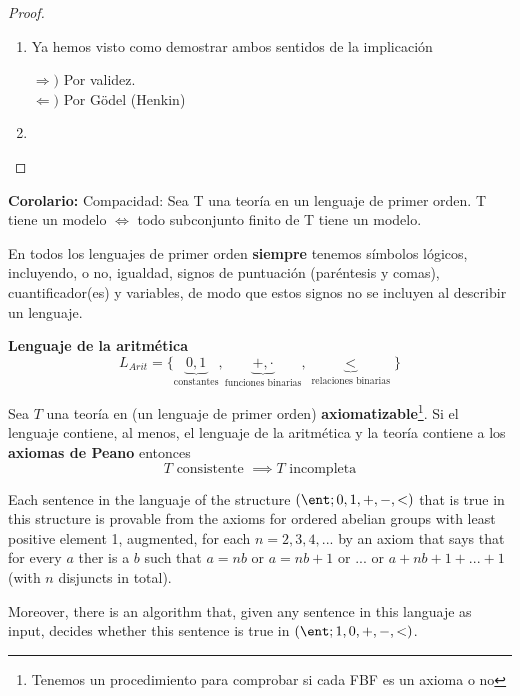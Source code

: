 \begin{proof}
\begin{enumerate}
\item
Ya hemos visto como demostrar ambos sentidos de la implicación

$\Rightarrow)$ Por validez.\\
$\Leftarrow)$ Por Gödel (Henkin)

\item
\end{enumerate}
\end{proof}

\textbf{Corolario:} Compacidad: Sea T una teoría en un lenguaje de primer orden. T tiene un modelo $\Leftrightarrow$ todo subconjunto finito de T tiene un modelo.

En todos los lenguajes de primer orden \textbf{siempre} tenemos símbolos lógicos, incluyendo, o no, igualdad, signos de puntuación (paréntesis y comas), cuantificador(es) y variables, de modo que estos signos no se incluyen al describir un lenguaje.

\begin{example}
\textbf{Lenguaje de la aritmética}
\[L_{Arit} = \{\underbrace{0,1}_{\text{constantes}},\underbrace{+,\cdot}_{\text{funciones binarias}}, \underbrace{<}_{\text{relaciones binarias}}\}\]
\end{example}

\begin{theorem}
Sea $T$ una teoría en (un lenguaje de primer orden) \textbf{axiomatizable}\footnote{Tenemos un procedimiento para comprobar si cada FBF es un axioma o no}. Si el lenguaje contiene, al menos, el lenguaje de la aritmética y la teoría contiene a los \textbf{axiomas de Peano} entonces
\[T \text{ consistente } \implies T \text{ incompleta}\]
\end{theorem}

\begin{theorem}
Each sentence in the languaje of the structure $(\ent;0,1,+,-,<)$ that is true in this structure is provable from the axioms for ordered abelian groups with least positive element 1, augmented, for each $n=2,3,4,...$ by an axiom that says that for every $a$ ther is a $b$ such that $a=nb$ or $a=nb+1$ or ... or $a+nb+1+...+1$ (with $n$ disjuncts in total).

Moreover, there is an algorithm that, given any sentence in this languaje as input, decides whether this sentence is true in $(\ent; 1,0,+,-,<)$.
\end{theorem}


